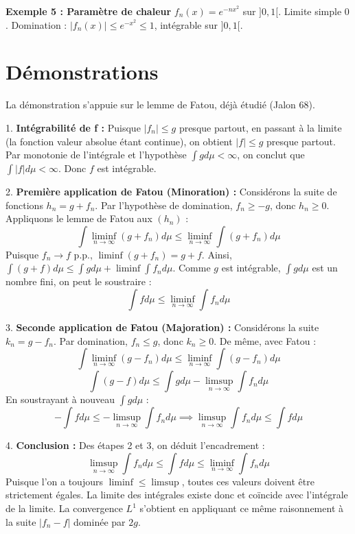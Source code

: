 \documentclass[11pt,a4paper]{article}
\begin{document}
\textbf{Exemple 5 : Paramètre de chaleur}
$f_n(x) = e^{-nx^2}$ sur $]0, 1[$.
Limite simple $0$. Domination : $|f_n(x)| \le e^{-x^2} \le 1$, intégrable sur $]0, 1[$.

\section{Démonstrations}

La démonstration s'appuie sur le lemme de Fatou, déjà étudié (Jalon 68).

1. \textbf{Intégrabilité de f :}
   Puisque $|f_n| \le g$ presque partout, en passant à la limite (la fonction valeur absolue étant continue), on obtient $|f| \le g$ presque partout. Par monotonie de l'intégrale et l'hypothèse $\int g d\mu < \infty$, on conclut que $\int |f| d\mu < \infty$. Donc $f$ est intégrable.

2. \textbf{Première application de Fatou (Minoration) :}
   Considérons la suite de fonctions $h_n = g + f_n$. Par l'hypothèse de domination, $f_n \ge -g$, donc $h_n \ge 0$.
   Appliquons le lemme de Fatou aux $(h_n)$ :
   $$\int \liminf_{n \to \infty} (g + f_n) d\mu \le \liminf_{n \to \infty} \int (g + f_n) d\mu$$
   Puisque $f_n \to f$ p.p., $\liminf (g + f_n) = g + f$.
   Ainsi, $\int (g + f) d\mu \le \int g d\mu + \liminf \int f_n d\mu$.
   Comme $g$ est intégrable, $\int g d\mu$ est un nombre fini, on peut le soustraire :
   $$\int f d\mu \le \liminf_{n \to \infty} \int f_n d\mu$$

3. \textbf{Seconde application de Fatou (Majoration) :}
   Considérons la suite $k_n = g - f_n$. Par domination, $f_n \le g$, donc $k_n \ge 0$.
   De même, avec Fatou :
   $$\int \liminf_{n \to \infty} (g - f_n) d\mu \le \liminf_{n \to \infty} \int (g - f_n) d\mu$$
   $$\int (g - f) d\mu \le \int g d\mu - \limsup_{n \to \infty} \int f_n d\mu$$
   En soustrayant à nouveau $\int g d\mu$ :
   $$-\int f d\mu \le -\limsup_{n \to \infty} \int f_n d\mu \implies \limsup_{n \to \infty} \int f_n d\mu \le \int f d\mu$$

4. \textbf{Conclusion :}
   Des étapes 2 et 3, on déduit l'encadrement :
   $$\limsup_{n \to \infty} \int f_n d\mu \le \int f d\mu \le \liminf_{n \to \infty} \int f_n d\mu$$
   Puisque l'on a toujours $\liminf \le \limsup$, toutes ces valeurs doivent être strictement égales.
   La limite des intégrales existe donc et coïncide avec l'intégrale de la limite. La convergence $L^1$ s'obtient en appliquant ce même raisonnement à la suite $|f_n - f|$ dominée par $2g$.
\end{document}
